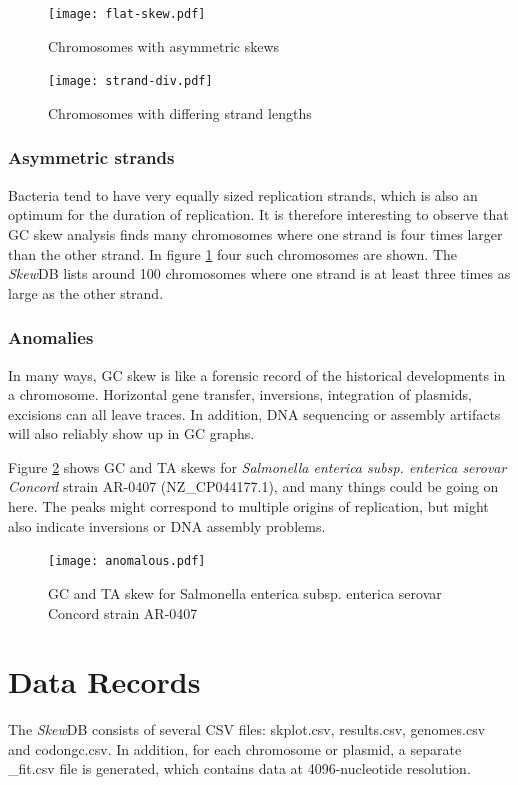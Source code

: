 \documentclass[fleqn,10pt]{wlscirep}
\begin{document}
\begin{figure}[ht]
  \centering
  \begin{minipage}[b]{0.45\linewidth}
    \texttt{[image: flat-skew.pdf]}
    \caption{Chromosomes with asymmetric skews}
    \label{fig:asym-skew}
  \end{minipage}
  \quad
  \begin{minipage}[b]{0.45\linewidth}
    \texttt{[image: strand-div.pdf]}
    \caption{Chromosomes with differing strand lengths}
    \label{fig:strand-div}
  \end{minipage}
\end{figure}

\subsubsection*{Asymmetric strands}
Bacteria tend to have very equally sized replication strands, which is also an optimum for the duration of replication. It is therefore interesting to observe that GC skew analysis finds many chromosomes where one strand is four times larger than the other strand.  In  figure \ref{fig:strand-div} four such chromosomes are shown. The \emph{Skew}DB lists around 100 chromosomes where one strand is at least three times as large as the other strand.


\subsubsection*{Anomalies}
In many ways, GC skew is like a forensic record of the historical developments in a chromosome. Horizontal gene transfer, inversions, integration of plasmids, excisions can all leave traces. In addition, DNA sequencing or assembly artifacts will also reliably show up in GC graphs.

Figure \ref{fig:anomalous} shows GC and TA skews for \emph{Salmonella enterica subsp. enterica serovar Concord} strain AR-0407 (NZ\_CP044177.1), and many things could be going on here. The peaks might correspond to multiple origins of replication, but might also indicate inversions or DNA assembly problems.

\begin{figure}[ht]
\centering
\texttt{[image: anomalous.pdf]}
\caption{GC and TA skew for Salmonella enterica subsp. enterica serovar Concord strain AR-0407}
\label{fig:anomalous}
\end{figure}

\section*{Data Records}
The \emph{Skew}DB consists of several CSV files: skplot.csv, results.csv, genomes.csv and codongc.csv.
In addition, for each chromosome or plasmid, a separate \_fit.csv file is generated, which contains data at 4096-nucleotide resolution.
\end{document}
